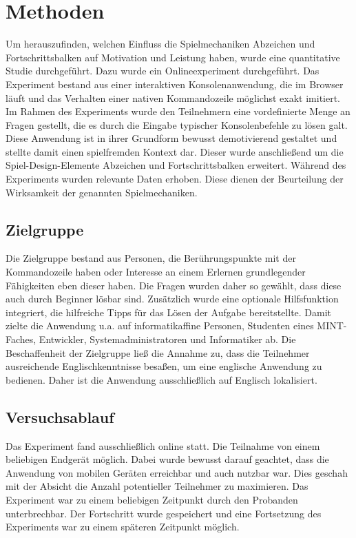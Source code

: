 \section{Methoden}

Um herauszufinden, welchen Einfluss die Spielmechaniken Abzeichen und Fortschrittsbalken auf Motivation und Leistung haben, wurde eine quantitative Studie durchgeführt. Dazu wurde ein Onlineexperiment durchgeführt. Das Experiment bestand aus einer interaktiven Konsolenanwendung, die im Browser läuft und das Verhalten einer nativen Kommandozeile möglichst exakt imitiert. Im Rahmen des Experiments wurde den Teilnehmern eine vordefinierte Menge an Fragen gestellt, die es durch die Eingabe typischer Konsolenbefehle zu lösen galt. Diese Anwendung ist in ihrer Grundform bewusst demotivierend gestaltet und stellte damit einen spielfremden Kontext dar. Dieser wurde anschließend um die Spiel-Design-Elemente Abzeichen und Fortschrittsbalken erweitert. Während des Experiments wurden relevante Daten erhoben. Diese dienen der Beurteilung der Wirksamkeit der genannten Spielmechaniken.

\subsection{Zielgruppe}
Die Zielgruppe bestand aus Personen, die Berührungspunkte mit der Kommandozeile haben oder Interesse an einem Erlernen grundlegender Fähigkeiten eben dieser haben. Die Fragen wurden daher so gewählt, dass diese auch durch Beginner lösbar sind.
Zusätzlich wurde eine optionale Hilfsfunktion integriert, die hilfreiche Tipps für das Lösen der Aufgabe bereitstellte.
Damit zielte die Anwendung u.a. auf informatikaffine Personen, Studenten eines MINT-Faches, Entwickler, Systemadministratoren und Informatiker ab.
Die Beschaffenheit der Zielgruppe ließ die Annahme zu, dass die Teilnehmer ausreichende Englischkenntnisse besaßen, um eine englische Anwendung zu bedienen. Daher ist die Anwendung ausschließlich auf Englisch lokalisiert.

\subsection{Versuchsablauf}
Das Experiment fand ausschließlich online statt. Die Teilnahme von einem beliebigen Endgerät möglich. Dabei wurde bewusst darauf geachtet, dass die Anwendung von mobilen Geräten erreichbar und auch nutzbar war. Dies geschah mit der Absicht die Anzahl potentieller Teilnehmer zu maximieren. Das Experiment war zu einem beliebigen Zeitpunkt durch den Probanden unterbrechbar. Der Fortschritt wurde gespeichert und eine Fortsetzung des Experiments war zu einem späteren Zeitpunkt möglich.

